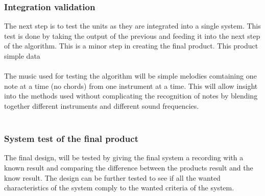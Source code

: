 \subsubsection{Integration validation}
The next step is to test the units as they are integrated into a single system.
This test is done by taking the output of the previous and feeding it into the next step of the algorithm. 
This is a minor step in creating the final product.
This product 
simple data 
\\\\
The music used for testing the algorithm will be simple melodies comtaining one note at a time (no chords) from one instrument at a time. This will allow insight into the methods used without complicating the recognition of notes by blending together different instruments and different sound frequencies.\\\\

\subsubsection{System test of the final product}
The final design, will be tested by giving the final system a recording with a known result and comparing the difference between the products result and the know result. The design can be further tested to see if all the wanted characteristics of the system comply to the wanted criteria of the system.


